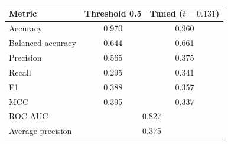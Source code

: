 \begin{tabular}{lcc}
\toprule
Metric & Threshold 0.5 & Tuned ($t = 0.131$) \\
\midrule
Accuracy & 0.970 & 0.960 \\
Balanced accuracy & 0.644 & 0.661 \\
Precision & 0.565 & 0.375 \\
Recall & 0.295 & 0.341 \\
F1 & 0.388 & 0.357 \\
MCC & 0.395 & 0.337 \\
\midrule
ROC AUC & \multicolumn{2}{c}{0.827} \\
Average precision & \multicolumn{2}{c}{0.375} \\
\bottomrule
\end{tabular}
